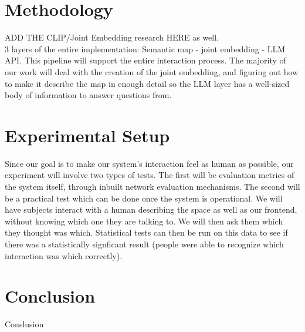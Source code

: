 \documentclass[letterpaper, 10 pt, conference]{ieeeconf}  %
\begin{document}
\section{Methodology}
    ADD THE CLIP/Joint Embedding research HERE as well.
    \\
    3 layers of the entire implementation: Semantic map - joint embedding - LLM API. This pipeline will support the entire interaction process. The majority of our work will deal with the creation of the joint embedding, and figuring out how to make it describe the map in enough detail so the LLM layer has a well-sized body of information to answer questions from. 


\section{Experimental Setup}
    Since our goal is to make our system's interaction feel as human as possible, our experiment will involve two types of tests. The first will be evaluation metrics of the system itself, through inbuilt network evaluation mechanisms. The second will be a practical test which can be done once the system is operational. We will have subjects interact with a human describing the space as well as our frontend, without knowing which one they are talking to. We will then ask them which they thought was which. Statistical tests can then be run on this data to see if there was a statistically signficant result (people were able to recognize which interaction was which correctly).


\section{Conclusion}
Conslusion

%
%
\end{document}
